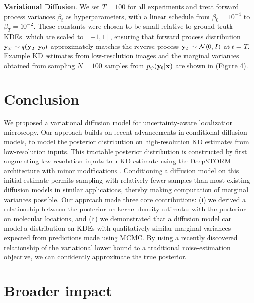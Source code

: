 \textbf{Variational Diffusion}. We set $T = 100$ for all experiments and treat forward process variances $\beta_{t}$ as hyperparameters, with a linear schedule from $\beta_{0}=10^{-4}$ to $\beta_{T}=10^{-2}$.
These constants were chosen to be small relative to ground truth KDEs, which are scaled to $[-1,1]$, ensuring that forward process distribution $\bold{y}_{T}\sim q(\bold{y}_{T}\lvert\bold{y}_{0})$ approximately matches the reverse process $\bold{y}_T\sim \mathcal{N}(0, I)$ at $t=T$. Example KD estimates from low-resolution images and the marginal variances obtained from sampling $N=100$ samples from $p_{\psi}(\bold{y}_{0}\lvert\bold{x})$ are shown in (Figure 4). 


\section{Conclusion}

We proposed a variational diffusion model for uncertainty-aware localization microscopy. Our approach builds on recent advancements in conditional diffusion models, to model the posterior distribution on high-resolution KD estimates from low-resolution inputs. This tractable posterior distribution is constructed by first augmenting low resolution inputs to a KD estimate using the DeepSTORM architecture with minor modifications \parencite{Nehme2020}. Conditioning a diffusion model on this initial estimate permits sampling with relatively fewer samples than most existing diffusion models in similar applications, thereby making computation of marginal variances possible. Our approach made three core contributions: (i) we derived a relationship between the posterior on kernel density estimates with the posterior on molecular locations, and (ii) we demonstrated that a diffusion model can model a distribution on KDEs with qualitatively similar marginal variances expected from predictions made using MCMC. By using a recently discovered relationship of the variational lower bound to a traditional noise-estimation objective, we can confidently approximate the true posterior.

\section{Broader impact}

